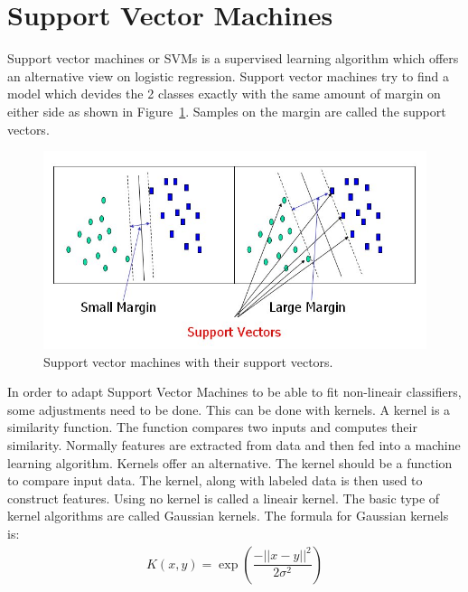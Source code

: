 \section{Support Vector Machines}
Support vector machines or SVMs is a supervised learning algorithm which offers an alternative view on logistic regression. Support vector machines try to find a model which devides the 2 classes exactly with the same amount of margin on either side as shown in Figure~\ref{fig:svm}. Samples on the margin are called the support vectors.
\begin{figure}[H]
\centering
\includegraphics[width=\textwidth]{Figures/svm}
\decoRule
\caption[Support Vector Machines]{Support vector machines with their support vectors.}
\label{fig:svm}
\end{figure}
\noindent In order to adapt Support Vector Machines to be able to fit non-lineair classifiers, some adjustments need to be done. This can be done with kernels. A kernel is a similarity function. The function compares two inputs and computes their similarity. Normally features are extracted from data and then fed into a machine learning algorithm. Kernels offer an alternative. The kernel should be a function to compare input data. The kernel, along with labeled data is then used to construct features. Using no kernel is called a lineair kernel. The basic type of kernel algorithms are called Gaussian kernels. The formula for Gaussian kernels is:
\begin{align}
K(x,y) = \exp{(\dfrac{-||x-y||^2}{2\sigma^2})}
\end{align}

